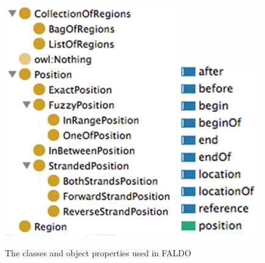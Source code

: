 \begin{figure}
\begin{center}
\includegraphics[height=10cm]{figures/classes.pdf}
\includegraphics[width=3.5cm]{figures/properties.pdf}
\end{center}
\caption{The classes and object properties used in FALDO}
\label{fig:ontology}
\end{figure}


